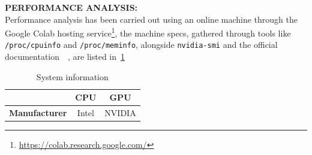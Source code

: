\documentclass[a4paper,10pt]{article}
\begin{document}
\bigskip
{}
\makeatletter{}\makeatother\label{sec:performance-analysis}
\noindent
\textbf{PERFORMANCE ANALYSIS:}
\\
Performance analysis has been carried out using an online machine through the Google Colab hosting service\footnote{\url{https://colab.research.google.com/}}, the machine specs, gathered through tools like \texttt{/proc/cpuinfo} and \texttt{/proc/meminfo}, alongside \texttt{nvidia-smi} and the official documentation~\cite{t4-info}~\cite{t4-product-brief}, are listed in~\ref{tbl:system}
\begin{center}
	\begin{longtable}{|c|c|c|}
		\caption{System information}\label{tbl:system}
		\\\hline\textbf{} & \textbf{CPU} & \textbf{GPU} \\\hline\hline
		\endfirsthead\hline\endlastfoot

		\textbf{Manufacturer}               & Intel                                                                                                               & NVIDIA                                                              \\\hline


\end{longtable}
\end{center}
\end{document}
